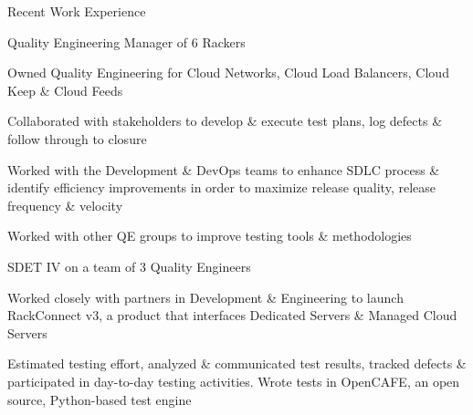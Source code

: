 \documentclass{resume} %
\begin{document}
\begin{rSection}{Recent Work Experience}
\begin{rSubsection}{}{}{}{}
\end{rSubsection}\vspace{-1em}



\begin{rSubsection}{}{}{}{}
{Quality Engineering Manager of 6 Rackers}

\item Owned Quality Engineering for Cloud Networks, Cloud Load Balancers, Cloud Keep \& Cloud Feeds
\item Collaborated with stakeholders to develop \& execute test plans, log defects \& follow through to closure
\item Worked with the Development \& DevOps teams to enhance SDLC process \& identify efficiency improvements in order to maximize release quality, release frequency \& velocity
\item Worked with other QE groups to improve testing tools \& methodologies

\end{rSubsection}\vspace{-1em}






  \begin{rSubsection}{}{}{}{}
{SDET IV on a team of 3 Quality Engineers}

\item Worked closely with partners in Development \& Engineering to launch RackConnect v3, a product that interfaces Dedicated Servers \& Managed Cloud Servers
\item Estimated testing effort, analyzed \& communicated test results, tracked defects \& participated in day-to-day testing activities. Wrote tests in OpenCAFE, an open source, Python-based test engine

\end{rSubsection}






\end{rSection}
\end{document}
